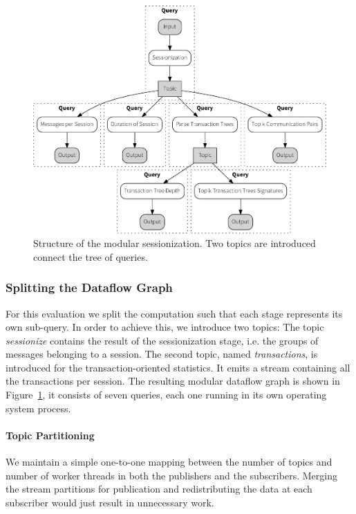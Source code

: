 \begin{figure}[p]
  \centering
    \includegraphics[width=1\textwidth]{figures/sessionize_split-crop}
  \caption[Dataflow graph for modular sessionization]{Structure of the modular
  sessionization. Two topics are introduced connect the tree of queries.}
  \label{fig:split}
\end{figure}

\subsubsection{Splitting the Dataflow Graph}

For this evaluation we split the computation such that each stage represents
its own sub-query. In order to achieve this, we introduce two topics: The topic
\emph{sessionize} contains the result of the sessionization stage, i.e. 
the groups of messages belonging to a session. The second topic, named
\emph{transactions}, is introduced for the transaction-oriented statistics.
It emits a stream containing all the transactions per session. The resulting
modular dataflow graph is shown in Figure~\ref{fig:split}, it consists of
seven queries, each one running in its own operating system process.

\paragraph{Topic Partitioning}

We maintain a simple one-to-one mapping between the number of topics and
number of worker threads in both the publishers and the subscribers.
Merging the stream partitions for publication and redistributing
the data at each subscriber would just result in unnecessary work.

